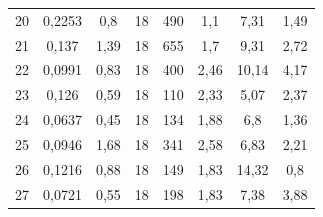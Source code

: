 \documentclass[12pt,a4paper]{article}
\begin{document}
\begin{table}[]
{\begin{tabular}{|c|c|c|c|c|c|c|c|}
    20                       & 0,2253                 & 0,8                        & 18                                         & 490                       & 1,1                                             & 7,31                                     & 1,49                                  \\
    21                       & 0,137                  & 1,39                       & 18                                         & 655                       & 1,7                                             & 9,31                                     & 2,72                                  \\
    22                       & 0,0991                 & 0,83                       & 18                                         & 400                       & 2,46                                            & 10,14                                    & 4,17                                  \\
    23                       & 0,126                  & 0,59                       & 18                                         & 110                       & 2,33                                            & 5,07                                     & 2,37                                  \\
    24                       & 0,0637                 & 0,45                       & 18                                         & 134                       & 1,88                                            & 6,8                                      & 1,36                                  \\
    25                       & 0,0946                 & 1,68                       & 18                                         & 341                       & 2,58                                            & 6,83                                     & 2,21                                  \\
    26                       & 0,1216                 & 0,88                       & 18                                         & 149                       & 1,83                                            & 14,32                                    & 0,8                                   \\
    27                       & 0,0721                 & 0,55                       & 18                                         & 198                       & 1,83                                            & 7,38                                     & 3,88                                  \\

\end{tabular}}
\end{table}
\end{document}
